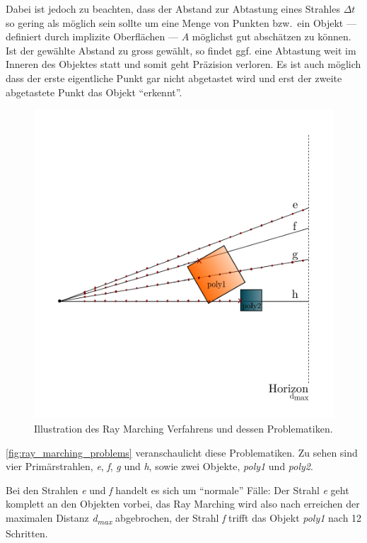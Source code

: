 Dabei ist jedoch zu beachten, dass der Abstand zur Abtastung eines Strahles
$\Delta t$ so gering als möglich sein sollte um eine Menge von Punkten bzw.\ ein
Objekt --- definiert durch implizite Oberflächen --- $A$ möglichst gut
abschätzen zu können. Ist der gewählte Abstand zu gross gewählt, so findet ggf.
eine Abtastung weit im Inneren des Objektes statt und somit geht Präzision
verloren.  Es ist auch möglich dass der erste eigentliche Punkt gar nicht
abgetastet wird und erst der zweite abgetastete Punkt das Objekt ``erkennt''.

\begin{figure}[H]
    \centering
    \includegraphics{img/ray_marching_problems.pdf}
    \caption{Illustration des Ray Marching Verfahrens und dessen
        Problematiken.\protect\footnotemark}\label{fig:ray_marching_problems}
\end{figure}

\autoref{fig:ray_marching_problems} veranschaulicht diese
Problematiken. Zu sehen sind vier Primärstrahlen, \textit{e},
\textit{f}, \textit{g} und \textit{h},  sowie zwei Objekte,
\textit{poly1} und \textit{poly2}.

Bei den Strahlen \textit{e} und \textit{f} handelt es sich um
``normale'' Fälle: Der Strahl \textit{e} geht komplett an den Objekten
vorbei, das Ray Marching wird also nach erreichen der maximalen Distanz
\textit{d\textsubscript{max}} abgebrochen, der Strahl \textit{f} trifft
das Objekt \textit{poly1} nach 12 Schritten.

